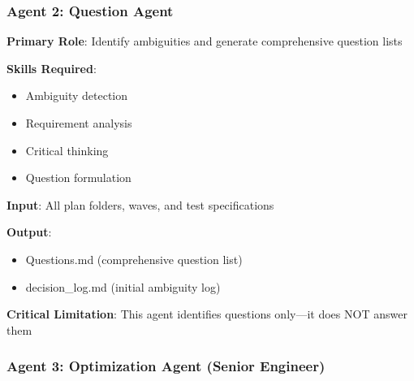 \documentclass[12pt,letterpaper]{article}
\begin{document}
\subsubsection{Agent 2: Question Agent}

\begin{tcolorbox}[colback=purple!5,colframe=purple,title=Question Agent Specification]
\textbf{Primary Role}: Identify ambiguities and generate comprehensive question lists

\textbf{Skills Required}:
\begin{itemize}
    \item Ambiguity detection
    \item Requirement analysis
    \item Critical thinking
    \item Question formulation
\end{itemize}

\textbf{Input}: All plan folders, waves, and test specifications

\textbf{Output}:
\begin{itemize}
    \item Questions.md (comprehensive question list)
    \item decision\_log.md (initial ambiguity log)
\end{itemize}

\textbf{Critical Limitation}: This agent identifies questions only—it does NOT answer them
\end{tcolorbox}

\subsubsection{Agent 3: Optimization Agent (Senior Engineer)}
\end{document}
